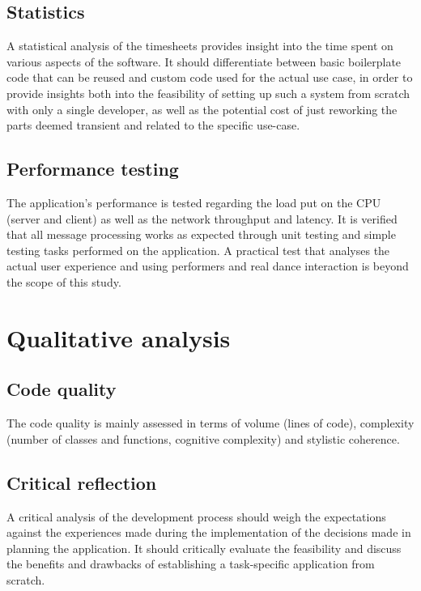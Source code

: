 \subsection{Statistics}

A statistical analysis of the timesheets provides insight into the time spent on various aspects of the software. It should differentiate between basic boilerplate code that can be reused and custom code used for the actual use case, in order to provide insights both into the feasibility of setting up such a system from scratch with only a single developer, as well as the potential cost of just reworking the parts deemed transient and related to the specific use-case.

\subsection{Performance testing}

The application's performance is tested regarding the load put on the \ac{CPU} (server and client) as well as the network throughput and latency. It is verified that all message processing works as expected through unit testing and simple testing tasks performed on the application. A practical test that analyses the actual user experience and using performers and real dance interaction is beyond the scope of this study.

\section{Qualitative analysis}

\subsection{Code quality}

The code quality is mainly assessed in terms of volume (lines of code), complexity (number of classes and functions, cognitive complexity) and stylistic coherence.

\subsection{Critical reflection}

A critical analysis of the development process should weigh the expectations against the experiences made during the implementation of the decisions made in planning the application. It should critically evaluate the feasibility and discuss the benefits and drawbacks of establishing a task-specific application from scratch.
